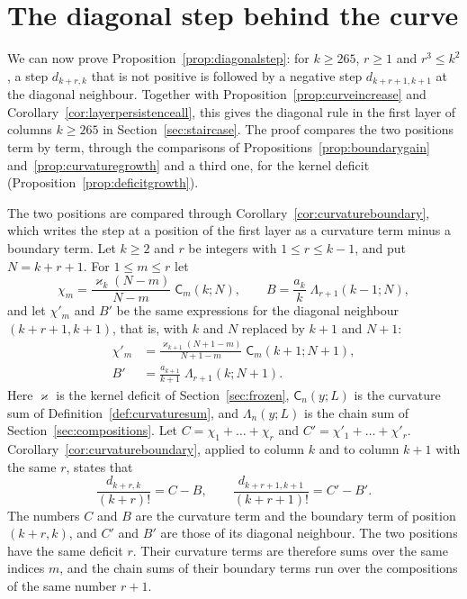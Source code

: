 \documentclass{amsart}
\makeatletter
\theoremstyle{definition}
\theoremstyle{remark}
\numberwithin{equation}{section}
\def\subsection{\@startsection{subsection}{2}\z@{.5\linespacing\@plus.7\linespacing}{-.5em}{\normalfont\bfseries\boldmath}}
\makeatother
\begin{document}
\section{The diagonal step behind the curve}\label{sec:step}
We can now prove Proposition~\ref{prop:diagonalstep}: for $k\ge265$,
$r\ge1$ and $r^3\le k^2$, a step $d_{k+r,k}$ that is not positive is
followed by a negative step $d_{k+r+1,k+1}$ at the diagonal neighbour.
Together with Proposition~\ref{prop:curveincrease} and
Corollary~\ref{cor:layerpersistenceall}, this gives the diagonal rule in
the first layer of columns $k\ge265$ in
Section~\ref{sec:staircase}. The proof compares the two positions term by
term, through the comparisons of Propositions~\ref{prop:boundarygain}
and~\ref{prop:curvaturegrowth} and a third one, for the kernel deficit
(Proposition~\ref{prop:deficitgrowth}).

\subsection{The two positions}\label{subsec:step-positions}

The two positions are compared through
Corollary~\ref{cor:curvatureboundary}, which writes the step at a position of
the first layer as a curvature term minus a boundary term. Let $k\ge2$ and
$r$ be integers with $1\le r\le k-1$, and put $N=k+r+1$. For $1\le m\le r$
let
\begin{equation}\label{eq:step-terms}
\chi_m=\frac{\varkappa_k(N-m)}{N-m}\;\mathsf C_m(k;N),\qquad
B=\frac{a_k}{k}\;\Lambda_{r+1}(k-1;N),
\end{equation}
and let $\chi'_m$ and $B'$ be the same expressions for the diagonal neighbour
$(k+r+1,k+1)$, that is, with $k$ and $N$ replaced by $k+1$ and $N+1$:
\begin{equation}\label{eq:step-neighbour}
\begin{aligned}
\chi'_m&=\frac{\varkappa_{k+1}(N+1-m)}{N+1-m}\;\mathsf C_m(k+1;N+1),\\
B'&=\frac{a_{k+1}}{k+1}\;\Lambda_{r+1}(k;N+1).
\end{aligned}
\end{equation}
Here $\varkappa$ is the kernel deficit of Section~\ref{sec:frozen},
$\mathsf C_n(y;L)$ is the curvature sum of
Definition~\ref{def:curvaturesum}, and $\Lambda_n(y;L)$ is the chain sum of
Section~\ref{sec:compositions}. Let $C=\chi_1+\dots+\chi_r$ and
$C'=\chi'_1+\dots+\chi'_r$. Corollary~\ref{cor:curvatureboundary}, applied to
column $k$ and to column $k+1$ with the same $r$, states that
\begin{equation}\label{eq:step-twopositions}
\frac{d_{k+r,k}}{(k+r)!}=C-B,\qquad
\frac{d_{k+r+1,k+1}}{(k+r+1)!}=C'-B'.
\end{equation}
The numbers $C$ and $B$ are the curvature term and the boundary term of
position $(k+r,k)$, and $C'$ and $B'$ are those of its diagonal neighbour.
The two positions have the same deficit $r$. Their curvature terms are
therefore sums over the same indices $m$, and the chain sums of their
boundary terms run over the compositions of the same number $r+1$.
\end{document}
